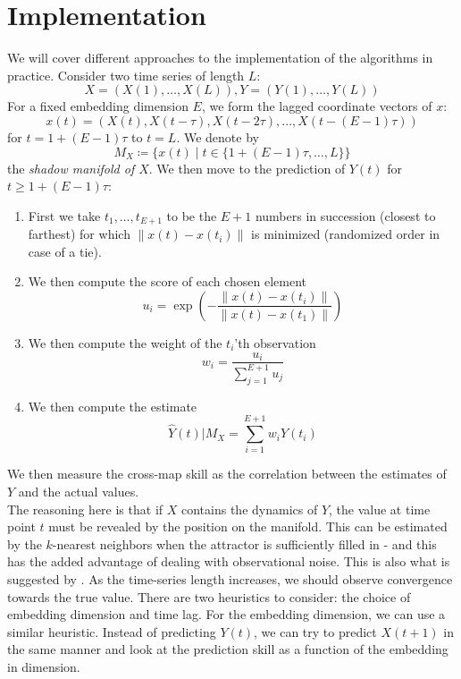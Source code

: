 \documentclass[11pt, a4paper]{memoir}
\theoremstyle{break}
\theoremstyle{break}
\theoremstyle{nonumberplain}
\newcommand{\norm}[1]{\left\lVert#1\right\rVert}
\begin{document}
\section{Implementation}
We will cover different approaches to the implementation of the algorithms in practice. Consider two time series of length $L$:
$$X=(X(1),\ldots, X(L)), Y=(Y(1),\ldots, Y(L))$$
For a fixed embedding dimension $E$, we form the lagged coordinate vectors of $x$:
$$x(t)=(X(t), X(t-\tau),X(t-2\tau),\ldots, X(t-(E-1)\tau))$$
for $t=1+(E-1)\tau$ to $t=L$. We denote by
$$M_X\coloneqq\{x(t)\mid t\in \{1+(E-1)\tau,\ldots,L\}\}$$
the \emph{shadow manifold of $X$}. We then move to the prediction of $Y(t)$ for $t\geqslant 1+(E-1)\tau$:
\begin{enumerate}[label=\arabic*.]
	\item First we take $t_1,\ldots,t_{E+1}$ to be the $E+1$ numbers in succession (closest to farthest) for which $\norm{x(t)-x(t_{i})}$ is minimized (randomized order in case of a tie).
	\item We then compute the score of each chosen element
	$$u_i=\exp\left(-\frac{\norm{x(t)-x(t_i)}}{\norm{x(t)-x(t_1)}}\right)$$
	\item We then compute the weight of the $t_i$'th observation
	$$w_i=\frac{u_i}{\sum_{j=1}^{E+1} u_j}$$
	\item We then compute the estimate
	$$\hat{Y}(t)|M_X=\sum_{i=1}^{E+1} w_i Y(t_i)$$
\end{enumerate}
We then measure the cross-map skill as the correlation between the estimates of $Y$ and the actual values.\\[5pt]
The reasoning here is that if $X$ contains the dynamics of $Y$, the value at time point $t$ must be revealed by the position on the manifold. This can be estimated by the $k$-nearest neighbors when the attractor is sufficiently filled in - and this has the added advantage of dealing with observational noise. This is also what is suggested by \cite{Casdagli}. As the time-series length increases, we should observe convergence towards the true value. There are two heuristics to consider: the choice of embedding dimension and time lag. For the embedding dimension, we can use a similar heuristic. Instead of predicting $Y(t)$, we can try to predict $X(t+1)$ in the same manner and look at the prediction skill as a function of the embedding in dimension. 
\end{document}
